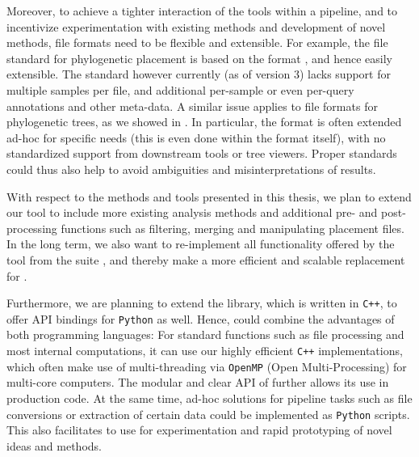 
Moreover, to achieve a tighter interaction of the tools within a pipeline,
and to incentivize experimentation with existing methods and development of novel methods,
file formats need to be flexible and extensible.
For example, the  file standard for phylogenetic placement \cite{Matsen2012}
is based on the  format \cite{JsonMemo,JsonStandard}, and hence easily extensible.
The standard however currently (as of  version 3) lacks support for multiple samples per file,
and additional per-sample or even per-query annotations and other meta-data.
A similar issue applies to file formats for phylogenetic trees, as we showed in \cite{Czech2017}.
In particular, the  format is often extended ad-hoc for specific needs
(this is even done within the  format itself),
with no standardized support from downstream tools or tree viewers.
Proper standards could thus also help to avoid ambiguities and misinterpretations of results.


With respect to the methods and tools presented in this thesis,
we plan to extend our  tool to include more existing analysis methods
and additional pre- and post-processing functions such as filtering, merging and manipulating placement files.
In the long term, we also want to re-implement all functionality offered by the
 tool from the  suite \cite{Matsen2010},
and thereby make  a more efficient and scalable replacement for .

Furthermore, we are planning to extend the  library, which is written in \texttt{C++},
to offer \acs{API} bindings for \texttt{Python} as well.
Hence,  could combine the advantages of both programming languages:
For standard functions such as file processing and most internal computations,
it can use our highly efficient \texttt{C++} implementations,
which often make use of multi-threading via \texttt{OpenMP} (Open Multi-Processing) for multi-core computers.
The modular and clear \acs{API} of  further allows its use in production code.
At the same time, ad-hoc solutions for pipeline tasks such as file conversions or extraction of certain data
could be implemented as \texttt{Python} scripts.
This also facilitates to use  for experimentation and rapid prototyping of novel ideas and methods.

